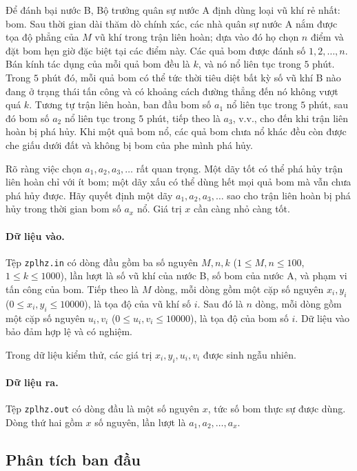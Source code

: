 \documentclass[11pt]{article}
\begin{document}
Để đánh bại nước B, Bộ trưởng quân sự nước A định dùng loại vũ khí rẻ nhất:
bom. Sau thời gian dài thăm dò chính xác, các nhà quân sự nước A nắm được tọa
độ phẳng của $M$ vũ khí trong trận liên hoàn; dựa vào đó họ chọn $n$ điểm và
đặt bom hẹn giờ đặc biệt tại các điểm này. Các quả bom được đánh số
$1,2,\ldots,n$. Bán kính tác dụng của mỗi quả bom đều là $k$, và nó nổ liên
tục trong $5$ phút. Trong $5$ phút đó, mỗi quả bom có thể tức thời tiêu diệt
bất kỳ số vũ khí B nào đang ở trạng thái tấn công và có khoảng cách đường
thẳng đến nó không vượt quá $k$. Tương tự trận liên hoàn, ban đầu bom số
$a_1$ nổ liên tục trong $5$ phút, sau đó bom số $a_2$ nổ liên tục trong
$5$ phút, tiếp theo là $a_3$, v.v., cho đến khi trận liên hoàn bị phá hủy.
Khi một quả bom nổ, các quả bom chưa nổ khác đều còn được che giấu dưới đất
và không bị bom của phe mình phá hủy.

Rõ ràng việc chọn $a_1,a_2,a_3,\ldots$ rất quan trọng. Một dãy tốt có thể phá
hủy trận liên hoàn chỉ với ít bom; một dãy xấu có thể dùng hết mọi quả bom mà
vẫn chưa phá hủy được. Hãy quyết định một dãy $a_1,a_2,a_3,\ldots$ sao cho
trận liên hoàn bị phá hủy trong thời gian bom số $a_x$ nổ. Giá trị $x$ cần
càng nhỏ càng tốt.

\paragraph{Dữ liệu vào.}
Tệp \texttt{zplhz.in} có dòng đầu gồm ba số nguyên $M,n,k$
($1\le M,n\le 100$, $1\le k\le 1000$), lần lượt là số vũ khí của nước B, số
bom của nước A, và phạm vi tấn công của bom. Tiếp theo là $M$ dòng, mỗi dòng
gồm một cặp số nguyên $x_i,y_i$ ($0\le x_i,y_i\le 10000$), là tọa độ của vũ
khí số $i$. Sau đó là $n$ dòng, mỗi dòng gồm một cặp số nguyên $u_i,v_i$
($0\le u_i,v_i\le 10000$), là tọa độ của bom số $i$. Dữ liệu vào bảo đảm hợp
lệ và có nghiệm.

Trong dữ liệu kiểm thử, các giá trị $x_i,y_i,u_i,v_i$ được sinh ngẫu nhiên.

\paragraph{Dữ liệu ra.}
Tệp \texttt{zplhz.out} có dòng đầu là một số nguyên $x$, tức số bom thực sự
được dùng. Dòng thứ hai gồm $x$ số nguyên, lần lượt là $a_1,a_2,\ldots,a_x$.

\subsection{Phân tích ban đầu}
\end{document}
